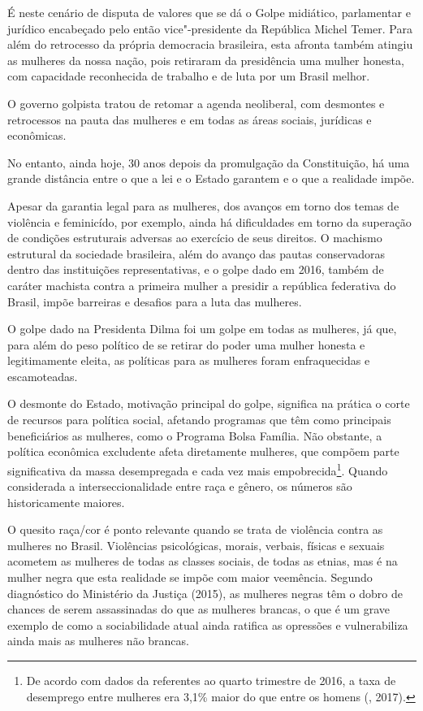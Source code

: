 É neste cenário de disputa de valores que se dá o Golpe midiático,
parlamentar e jurídico encabeçado pelo então vice"-presidente da
República Michel Temer. Para além do retrocesso da própria
democracia brasileira, esta afronta também atingiu as mulheres da nossa
nação, pois retiraram da presidência uma mulher honesta, com capacidade
reconhecida de trabalho e de luta por um Brasil melhor.

O governo golpista tratou de retomar a agenda neoliberal, com desmontes e
retrocessos na pauta das mulheres e em todas as áreas sociais, jurídicas
e econômicas.

No entanto, ainda hoje, 30 anos depois da promulgação da Constituição,
há uma grande distância entre o que a lei e o Estado garantem e o que a
realidade impõe.

Apesar da garantia legal para as mulheres, dos avanços em torno dos
temas de violência e feminicído, por exemplo, ainda há dificuldades em
torno da superação de condições estruturais adversas ao exercício de
seus direitos. O machismo estrutural da sociedade brasileira, além do
avanço das pautas conservadoras dentro das instituições representativas,
e o golpe dado em 2016, também de caráter machista contra a primeira
mulher a presidir a república federativa do Brasil, impõe barreiras e
desafios para a luta das mulheres.

O golpe dado na Presidenta Dilma foi um golpe em todas as mulheres, já
que, para além do peso político de se retirar do poder uma mulher
honesta e legitimamente eleita, as políticas para as mulheres foram
enfraquecidas e escamoteadas.

O desmonte do Estado, motivação principal do golpe, significa na prática
o corte de recursos para política social, afetando programas que têm
como principais beneficiários as mulheres, como o Programa Bolsa
Família. Não obstante, a política econômica excludente afeta diretamente
mulheres, que compõem parte significativa da massa desempregada e cada
vez mais empobrecida\footnote{De acordo com dados da  referentes
  ao quarto trimestre de 2016, a taxa de desemprego entre mulheres era
  3,1\% maior do que entre os homens (, 2017).}. Quando considerada
a interseccionalidade entre raça e gênero, os números são historicamente
maiores.

O quesito raça/cor é ponto relevante quando se trata de violência
contra as mulheres no Brasil. Violências psicológicas, morais, verbais,
físicas e sexuais acometem as mulheres de todas as classes sociais, de
todas as etnias, mas é na mulher negra que esta realidade se impõe com
maior veemência. Segundo diagnóstico do Ministério da Justiça (2015), as
mulheres negras têm o dobro de chances de serem assassinadas do que as
mulheres brancas, o que é um grave exemplo de como a sociabilidade atual
ainda ratifica as opressões e vulnerabiliza ainda mais as mulheres não
brancas.

